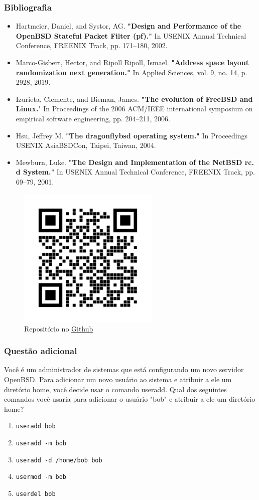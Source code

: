 \documentclass[9pt,xcolor=table]{beamer}
\begin{document}
\begin{frame}
  \frametitle{Bibliografia}
  \begin{itemize}
    \item Hartmeier, Daniel, and Systor, AG. \textbf{"Design and Performance of the OpenBSD Stateful Packet Filter (pf)."} In USENIX Annual Technical Conference, FREENIX Track, pp. 171--180, 2002.
    \item Marco-Gisbert, Hector, and Ripoll Ripoll, Ismael. \textbf{"Address space layout randomization next generation."} In Applied Sciences, vol. 9, no. 14, p. 2928, 2019.
    \item Izurieta, Clemente, and Bieman, James. \textbf{"The evolution of FreeBSD and Linux.}" In Proceedings of the 2006 ACM/IEEE international symposium on empirical software engineering, pp. 204--211, 2006.
    \item Hsu, Jeffrey M. \textbf{"The dragonflybsd operating system."} In Proceedings USENIX AsiaBSDCon, Taipei, Taiwan, 2004.
    \item Mewburn, Luke. \textbf{"The Design and Implementation of the NetBSD rc. d System."} In USENIX Annual Technical Conference, FREENIX Track, pp. 69--79, 2001.
  \end{itemize}
\end{frame}
\begin{frame}
\begin{figure}
\centering
\includegraphics[width=0.6\textwidth]{imagens/frame.png}
\caption{Repositório no \href{https://github.com/pigor12/latex-openbsd}{Github}}
\end{figure}
\end{frame}
\begin{frame}[fragile]
  \frametitle{Questão adicional}
  \justifying
  Você é um administrador de sistemas que está configurando um novo servidor OpenBSD. Para adicionar um novo usuário ao sistema e atribuir a ele um diretório home, você decide usar o comando useradd. Qual dos seguintes comandos você usaria para adicionar o usuário "bob" e atribuir a ele um diretório home?
  \begin{enumerate}
  \item \verb|useradd bob|
  \item \verb|useradd -m bob|
  \item \verb|useradd -d /home/bob bob|
  \item \verb|usermod -m bob|
  \item \verb|userdel bob|
  \end{enumerate}
\end{frame}
\end{document}

